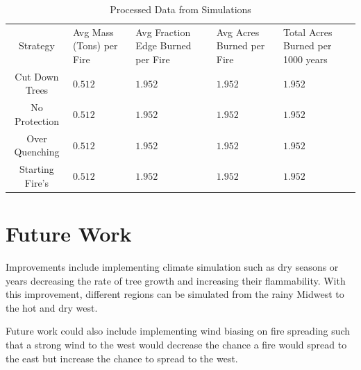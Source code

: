 \documentclass[ aps, pra, reprint, notitlepage ]{revtex4-1}
\begin{document}
\begin{table}[b]%
	\caption{\label{ProcessedData}Processed Data from Simulations}
	\begin{ruledtabular}
		\begin{tabular}{c||p{3cm}|p{3cm}|p{3cm}|p{3cm}}
			Strategy&
			Avg Mass (Tons) per Fire&
			Avg Fraction Edge Burned per Fire&
			Avg Acres Burned per Fire&
			Total Acres Burned per 1000 years\\
			\colrule
			Cut Down Trees & $0.512$ & $1.952$ & $1.952$ & $1.952$\\
			No Protection & $0.512$ & $1.952$ & $1.952$ & $1.952$\\
			Over Quenching & $0.512$ & $1.952$ & $1.952$ & $1.952$\\
			Starting Fire’s & $0.512$ & $1.952$ & $1.952$ & $1.952$\\
		\end{tabular}
	\end{ruledtabular}
\end{table}


\section{\label{FutureWork}Future Work}

Improvements include implementing climate simulation such as dry seasons or years decreasing the rate of tree growth and increasing their flammability. With this improvement, different regions can be simulated from the rainy Midwest to the hot and dry west.

Future work could also include implementing wind biasing on fire spreading such that a strong wind to the west would decrease the chance a fire would spread to the east but increase the chance to spread to the west.


\end{document}
